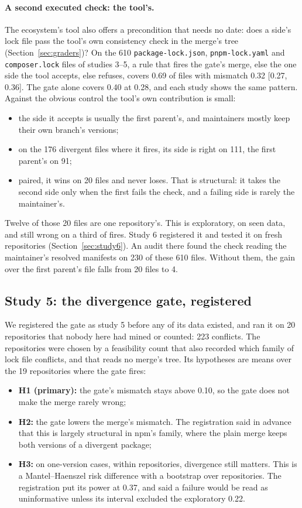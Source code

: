\documentclass[11pt]{article}
\newcommand{\code}[1]{\texttt{#1}}
\begin{document}
\paragraph{A second executed check: the tool's.}
The ecosystem's tool also offers a precondition that needs no date: does a side's lock file pass
the tool's own consistency check in the merge's tree (Section~\ref{sec:graders})? On the 610
\code{package-lock.json}, \code{pnpm-lock.yaml} and \code{composer.lock} files of studies 3--5,
a rule that fires the gate's merge, else the one side the tool accepts, else refuses, covers 0.69
of files with mismatch 0.32 [0.27, 0.36]. The gate alone covers 0.40 at 0.28, and each study
shows the same pattern. Against the obvious control the tool's own contribution is small:
\begin{itemize}
  \item the side it accepts is usually the first parent's, and maintainers mostly keep their own
  branch's versions;
  \item on the 176 divergent files where it fires, its side is right on 111, the first parent's
  on 91;
  \item paired, it wins on 20 files and never loses. That is structural: it takes the second side
  only when the first fails the check, and a failing side is rarely the maintainer's.
\end{itemize}
Twelve of those 20 files are one repository's. This is exploratory, on seen data, and still
wrong on a third of fires. Study 6 registered it and tested it on fresh repositories
(Section~\ref{sec:study6}). An audit there found the check reading the maintainer's resolved
manifests on 230 of these 610 files. Without them, the gain over the first parent's file falls
from 20 files to 4.

\subsection{Study 5: the divergence gate, registered}
\label{sec:gate}

We registered the gate as study 5 before any of its data existed, and ran it on 20 repositories
that nobody here had mined or counted: 223 conflicts. The repositories were chosen by a
feasibility count that also recorded which family of lock file conflicts, and that reads no
merge's tree. Its hypotheses are means over the 19 repositories where the gate fires:
\begin{itemize}
  \item \textbf{H1 (primary):} the gate's mismatch stays above 0.10, so the gate does not make
  the merge rarely wrong;
  \item \textbf{H2:} the gate lowers the merge's mismatch. The registration said in advance that
  this is largely structural in npm's family, where the plain merge keeps both versions of a
  divergent package;
  \item \textbf{H3:} on one-version cases, within repositories, divergence still matters. This is
  a Mantel--Haenszel risk difference with a bootstrap over repositories. The registration put its
  power at 0.37, and said a failure would be read as uninformative unless its interval excluded
  the exploratory 0.22.
\end{itemize}
\end{document}
